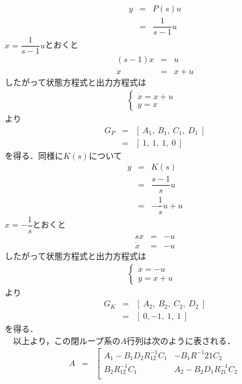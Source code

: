 \documentclass[a4paper,11pt]{jarticle}
\begin{document}
\begin{enumerate}
\begin{enumerate}[(1)]
	\begin{eqnarray*}
	 y & = & P(s)u \nonumber\\
	   & = & \dfrac{1}{s-1}u
	\end{eqnarray*}
	$ x = \dfrac{1}{s-1}u $とおくと
	\begin{eqnarray*}
	 (s-1) x & = & u \\
	 \dot{x} & = & x + u
	\end{eqnarray*}
	したがって状態方程式と出力方程式は
	\begin{eqnarray}
	 \begin{cases}
	  \dot{x} = x + u & \\
	  y = x &
	 \end{cases}
	\end{eqnarray}
	より
	\begin{eqnarray}
	 G_P & = & \left[ ~ A_1, ~ B_1, ~ C_1, ~ D_1 ~ \right] \nonumber\\
	     & = & \left[ ~ 1, ~ 1, ~ 1, ~ 0 ~ \right]
	\end{eqnarray}
	 を得る．同様に$ K(s) $について
	\begin{eqnarray*}
	 y & = & K(s)\\
	   & = & \dfrac{s-1}{s}u\\
	   & = & -\dfrac{1}{s}u + u
	\end{eqnarray*}
	$ x = -\dfrac{1}{s} $とおくと
	\begin{eqnarray*}
	 sx & = & -u\\
	 \dot{x} & = & -u
	\end{eqnarray*}
	したがって状態方程式と出力方程式は
	\begin{eqnarray}
	 \begin{cases}
	  \dot{x} = -u & \\
	  y = x + u &
	 \end{cases}
	\end{eqnarray}
	 より
	 \begin{eqnarray}
	  G_K & = & \left[ ~ A_2, ~ B_2, ~ C_2, ~ D_2 ~ \right] \nonumber\\
	      & = & \left[ ~ 0, -1, ~ 1, ~ 1 ~ \right]
	 \end{eqnarray}
	 を得る．\\
	 \ \ 以上より，この閉ループ系の$ A $行列は次のように表される．
	 \begin{eqnarray}
	  A & = & \left[
		   \begin{array}{cc}
		    A_1 - B_1D_2R^{-1}_{12}C_1 & -B_1R^{-1}{21}C_2 \\
		    B_2R^{-1}_{12}C_1 & A_2 - B_2D_1R^{-1}_{21}C_2 \\

\end{array}
\end{eqnarray}
\end{enumerate}
\end{enumerate}
\end{document}
